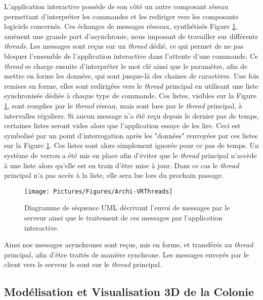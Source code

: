 	L'application interactive possède de son côté un autre composant réseau permettant d'interpréter les commandes et les rediriger vers les composants logiciels concernés. Ces échanges de messages réseaux, synthétisés Figure \ref{VRThreads}, amènent une grande part d'asynchronie, nous imposant de travailler sur différents \textit{threads}. Les messages sont reçus sur un \textit{thread} dédié, ce qui permet de ne pas bloquer l'ensemble de l'application interactive dans l'attente d'une commande. Ce \textit{thread} se charge ensuite d'interpréter le mot clé ainsi que le paramètre, afin de mettre en forme les données, qui sont jusque-là des chaines de caractères. Une fois remises en forme, elles sont redirigées vers le \textit{thread} principal en utilisant une liste synchronisée dédiée à chaque type de commande. Ces listes, visibles sur la Figure \ref{VRThreads}, sont remplies par le \textit{thread} réseau, mais sont lues par le \textit{thread} principal, à intervalles réguliers. 
	Si aucun message n'a été reçu depuis le dernier pas de temps, certaines listes seront vides alors que l'application essaye de les lire. Ceci est symbolisé par un point d'interrogation après les "données" renvoyées par ces listes sur la Figure \ref{VRThreads}. Ces listes sont alors simplement ignorée pour ce pas de temps. 
	Un système de verrou a été mis en place afin d'éviter que le \textit{thread} principal n'accède à une liste alors qu'elle est en train d'être mise à jour. Dans ce cas le \textit{thread} principal n'a pas accès à la liste, elle sera lue lors du prochain passage.
	
	\begin{figure}
		\texttt{[image: Pictures/Figures/Archi-VRThreads]}
		\caption{Diagramme de séquence UML décrivant l'envoi de messages par le serveur ainsi que le traitement de ces messages par l'application interactive.}
		\label{VRThreads}
	\end{figure}
	
	Ainsi nos messages asynchrones sont reçus, mis en forme, et transférés au \textit{thread} principal, afin d'être traités de manière synchrone. Les messages envoyés par le client vers le serveur le sont sur le \textit{thread} principal.
	
	\subsection{Modélisation et Visualisation 3D de la Colonie}		
	
